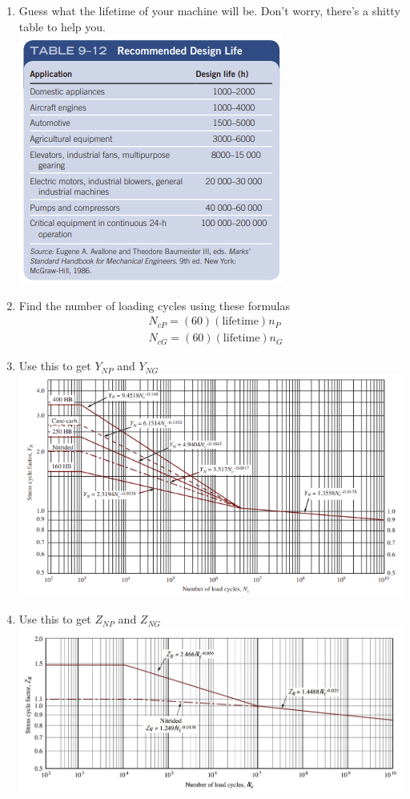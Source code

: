 \documentclass[11pt, fleqn]{article}
\begin{document}
\begin{enumerate}
    \item Guess what the lifetime of your machine will be. Don't worry, there's a shitty table to help you.\\
    \includegraphics[scale=1]{Gears/9-12.png}
    \item Find the number of loading cycles using these formulas
    \begin{align*}
        &N_{cP}=(60)(\text{lifetime})n_P\\
        &N_{cG}=(60)(\text{lifetime})n_G
    \end{align*}
    \item Use this to get $Y_{NP}$ and $Y_{NG}$\\
    \includegraphics[scale=1]{Gears/Fig 9-21.png}
    \item Use this to get $Z_{NP}$ and $Z_{NG}$\\
    \includegraphics[scale=0.5]{Gears/New-Zn.png}

\end{enumerate}
\end{document}
